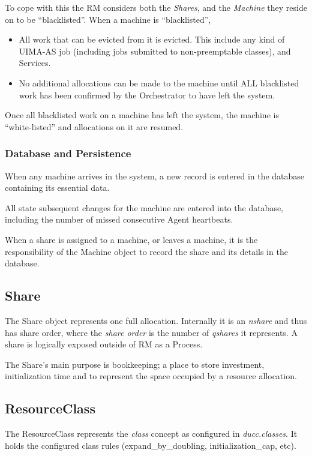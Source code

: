    To cope with this the RM considers both the {\em Shares}, and the {\em Machine} they reside on
   to be ``blacklisted''.  When a machine is ``blacklisted'',
   \begin{itemize}
     \item All work that can be evicted from it is evicted.  This include any kind of UIMA-AS
       job (including jobs submitted to non-preemptable classes),  and Services.
     \item No additional allocations can be made to the machine until ALL blacklisted work
       has been confirmed by the Orchestrator to have left the system.
   \end{itemize}
   
    Once all blacklisted work on a machine has left the system, the machine is ``white-listed'' and
    allocations on it are resumed.

\subsubsection{Database and Persistence}
   When any machine arrives in the system, a new record is entered in the database containing its
   essential data.

   All state subsequent changes for the machine are entered into the database, including the number
   of missed consecutive Agent heartbeats.

   When a share is assigned to a machine, or leaves a machine, it is the responsibility of the Machine object to
   record the share and its details in the database.

\subsection{Share}
    The Share object represents one full allocation.  Internally it is an {\em nshare} and thus
    has share order, where the {\em share order} is the number of {\em qshares} it represents.  A
    share is logically exposed outside of RM as a Process.

    The Share's main purpose is bookkeeping; a place to store investment, initialization time and
    to represent the space occupied by a resource allocation.

\subsection{ResourceClass}

    The ResourceClass represents the {\em class} concept as configured in {\em ducc.classes}.  It
    holds the configured class rules (expand\_by\_doubling, initialization\_cap, etc).

